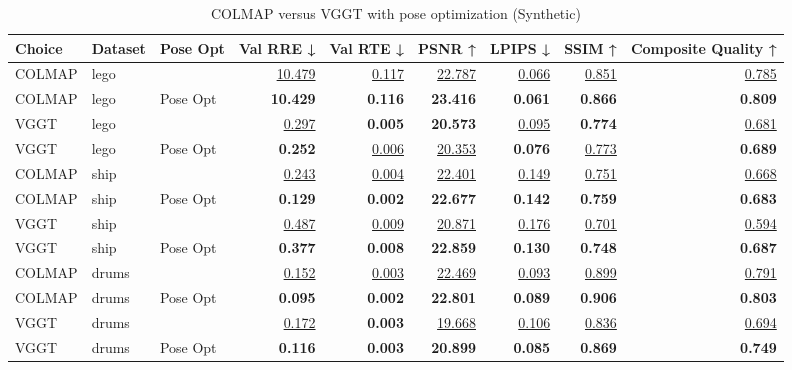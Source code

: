 \begin{table}[H]
\caption{\ifdefined\customcaption \customcaption \else COLMAP versus VGGT with pose optimization (Synthetic) \fi}
\label{tab:04_pose_opt_synthetic}
\centering
\scriptsize
\begin{tabular}{lllrrrrrr}
\toprule
Choice & Dataset & Pose Opt & Val RRE ↓ & Val RTE ↓ & PSNR ↑ & LPIPS ↓ & SSIM ↑ & Composite Quality ↑ \\
\midrule
COLMAP & lego &  & \underline{10.479} & \underline{0.117} & \underline{22.787} & \underline{0.066} & \underline{0.851} & \underline{0.785} \\
COLMAP & lego & Pose Opt & \textbf{10.429} & \textbf{0.116} & \textbf{23.416} & \textbf{0.061} & \textbf{0.866} & \textbf{0.809} \\
\midrule
VGGT & lego &  & \underline{0.297} & \textbf{0.005} & \textbf{20.573} & \underline{0.095} & \textbf{0.774} & \underline{0.681} \\
VGGT & lego & Pose Opt & \textbf{0.252} & \underline{0.006} & \underline{20.353} & \textbf{0.076} & \underline{0.773} & \textbf{0.689} \\
\midrule
COLMAP & ship &  & \underline{0.243} & \underline{0.004} & \underline{22.401} & \underline{0.149} & \underline{0.751} & \underline{0.668} \\
COLMAP & ship & Pose Opt & \textbf{0.129} & \textbf{0.002} & \textbf{22.677} & \textbf{0.142} & \textbf{0.759} & \textbf{0.683} \\
\midrule
VGGT & ship &  & \underline{0.487} & \underline{0.009} & \underline{20.871} & \underline{0.176} & \underline{0.701} & \underline{0.594} \\
VGGT & ship & Pose Opt & \textbf{0.377} & \textbf{0.008} & \textbf{22.859} & \textbf{0.130} & \textbf{0.748} & \textbf{0.687} \\
\midrule
COLMAP & drums &  & \underline{0.152} & \underline{0.003} & \underline{22.469} & \underline{0.093} & \underline{0.899} & \underline{0.791} \\
COLMAP & drums & Pose Opt & \textbf{0.095} & \textbf{0.002} & \textbf{22.801} & \textbf{0.089} & \textbf{0.906} & \textbf{0.803} \\
\midrule
VGGT & drums &  & \underline{0.172} & \textbf{0.003} & \underline{19.668} & \underline{0.106} & \underline{0.836} & \underline{0.694} \\
VGGT & drums & Pose Opt & \textbf{0.116} & \textbf{0.003} & \textbf{20.899} & \textbf{0.085} & \textbf{0.869} & \textbf{0.749} \\
\bottomrule
\end{tabular}
\end{table}